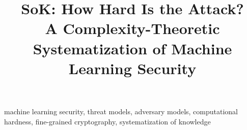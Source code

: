 \documentclass[conference,compsoc]{IEEEtran}
\begin{document}
\title{SoK: How Hard Is the Attack?\\
A Complexity-Theoretic Systematization of Machine Learning Security}

\author{
}

\maketitle

\nocite{*}

\begin{abstract}

\end{abstract}

\begin{IEEEkeywords}
machine learning security, threat models, adversary models, computational
hardness, fine-grained cryptography, systematization of knowledge
\end{IEEEkeywords}













\end{document}
